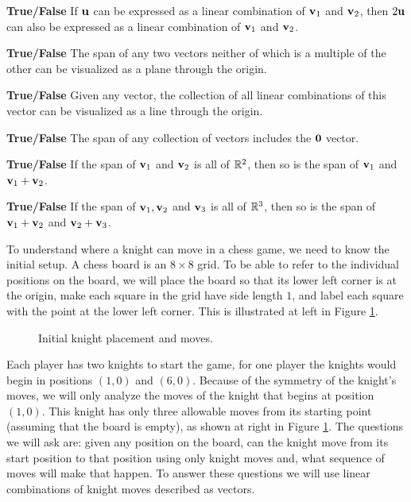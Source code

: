 \item \textbf{True/False} If $\mathbf{u}$ can be expressed as a linear combination of $\mathbf{v}_1$ and $\mathbf{v}_2$, then $2\mathbf{u}$ can also be expressed as a linear combination of $\mathbf{v}_1$ and $\mathbf{v}_2$.

\item \textbf{True/False} The span of any two vectors neither of which is a multiple of the other can be visualized as a plane through the origin.

\item \textbf{True/False} Given any vector, the collection of all linear combinations of this vector can be visualized as a line through the origin.

\item \textbf{True/False} The span of any collection of vectors includes the $\mathbf{0}$ vector.

\item \textbf{True/False} If the span of $\mathbf{v}_1$ and $\mathbf{v}_2$ is all of
$\mathbb{R}^2$, then so is the span of $\mathbf{v}_1$ and $\mathbf{v}_1+\mathbf{v}_2$.

\item \textbf{True/False} If the span of $\mathbf{v}_1, \mathbf{v}_2$ and $\mathbf{v}_3$ is all of $\mathbb{R}^3$, then so is the span of $\mathbf{v}_1+\mathbf{v}_2$ and $\mathbf{v}_2+\mathbf{v}_3$.

\ea
\ee

\label{sec:proj_knight}

To understand where a knight can move in a chess game, we need to know the initial setup. A chess board is an $8 \times 8$ grid. To be able to refer to the individual positions on the board, we will place the board so that its lower left corner is at the origin, make each square in the grid have side length $1$, and label each square with the point at the lower left corner. This is illustrated at left in Figure \ref{F:knight_2}. 

\begin{figure}[h]
\begin{center}
 \hspace{0.2in} 
\caption{Initial knight placement and moves.}
\label{F:knight_2}
\end{center}
\end{figure}

Each player has two knights to start the game, for one player the knights would begin in positions $(1,0)$ and $(6,0)$. Because of the symmetry of the knight's moves, we will only analyze the moves of the knight that begins at position $(1,0)$. This knight has only three allowable moves from its starting point (assuming that the board is empty), as shown at right in Figure \ref{F:knight_2}. The questions we will ask are: given any position on the board, can the knight move from its start position to that position using only knight moves and, what sequence of moves will make that happen. To answer these questions we will use linear combinations of knight moves described as vectors.

